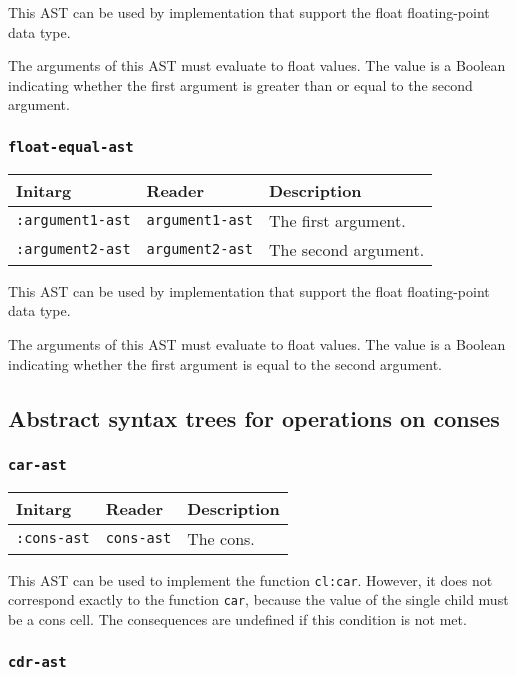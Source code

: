 This AST can be used by implementation that support the float
floating-point data type.

The arguments of this AST must evaluate to float
values.  The value is a Boolean indicating whether the first argument
is greater than or equal to the second argument.

\subsubsection{\texttt{float-equal-ast}}
\label{sec-ast-float-equal}

\begin{tabular}{|l|l|l|}
\hline
Initarg & Reader & Description\\
\hline\hline
\texttt{:argument1-ast} & \texttt{argument1-ast} & The first argument.\\
\hline
\texttt{:argument2-ast} & \texttt{argument2-ast} & The second argument.\\
\hline
\end{tabular}

This AST can be used by implementation that support the float
floating-point data type.

The arguments of this AST must evaluate to float
values.  The value is a Boolean indicating whether the first argument
is equal to the second argument.

\subsection{Abstract syntax trees for operations on conses}

\subsubsection{\texttt{car-ast}}
\label{sec-ast-car}

\begin{tabular}{|l|l|l|}
  \hline
  Initarg & Reader & Description\\
  \hline\hline
  \texttt{:cons-ast} & \texttt{cons-ast} & The cons.\\
  \hline
\end{tabular}

This AST can be used to implement the function \texttt{cl:car}. However,
it does not correspond exactly to the function \texttt{car}, because
the value of the single child must be a cons cell. The consequences
are undefined if this condition is not met.

\subsubsection{\texttt{cdr-ast}}
\label{sec-ast-cdr}


